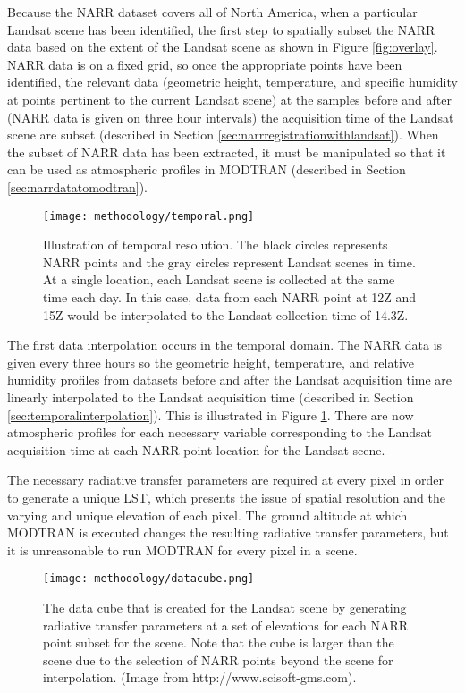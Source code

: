 \documentclass{book}
\begin{document}
Because the NARR dataset covers all of North America, when a particular Landsat scene has been identified, the first step to spatially subset the NARR data based on the extent of the Landsat scene as shown in Figure \ref{fig:overlay}.  NARR data is on a fixed grid, so once the appropriate points have been identified, the relevant data (geometric height, temperature, and specific humidity at points pertinent to the current Landsat scene) at the samples before and after (NARR data is given on three hour intervals) the acquisition time of the Landsat scene are subset (described in Section \ref{sec:narrregistrationwithlandsat}).  When the subset of NARR data has been extracted, it must be manipulated so that it can be used as atmospheric profiles in MODTRAN (described in Section \ref{sec:narrdatatomodtran}).

\begin{figure}[H]
\centering
\texttt{[image: methodology/temporal.png]}
\caption{Illustration of temporal resolution.  The black circles represents NARR points and the gray circles represent Landsat scenes in time.  At a single location, each Landsat scene is collected at the same time each day.  In this case, data from each NARR point at 12Z and 15Z would be interpolated to the Landsat collection time of 14.3Z.}
\label{fig:temporal}
\end{figure}

The first data interpolation occurs in the temporal domain.  The NARR data is given every three hours so the geometric height, temperature, and relative humidity profiles from datasets before and after the Landsat acquisition time are linearly interpolated to the Landsat acquisition time (described in Section \ref{sec:temporalinterpolation}).  This is illustrated in Figure \ref{fig:temporal}.  There are now atmospheric profiles for each necessary variable corresponding to the Landsat acquisition time at each NARR point location for the Landsat scene.

The necessary radiative transfer parameters are required at every pixel in order to generate a unique LST, which presents the issue of spatial resolution and the varying and unique elevation of each pixel.  The ground altitude at which MODTRAN is executed changes the resulting radiative transfer parameters, but it is unreasonable to run MODTRAN for every pixel in a scene.

\begin{figure}[H]
\centering
\texttt{[image: methodology/datacube.png]}
\caption{The data cube that is created for the Landsat scene by generating radiative transfer parameters at a set of elevations for each NARR point subset for the scene.  Note that the cube is larger than the scene due to the selection of NARR points beyond the scene for interpolation. (Image from http://www.scisoft-gms.com).}
\label{fig:datacube}
\end{figure}
\end{document}
